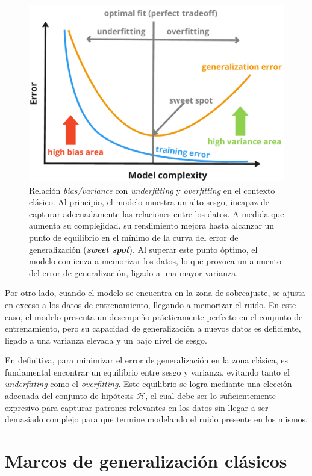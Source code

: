 \begin{figure}[h]
    \centering
    \includegraphics[width=0.6\linewidth]{img/biasvarianceunderoverfitting.png}
    \caption[Relación \textit{bias/variance} con \textit{underfitting} y \textit{overfitting} en el contexto clásico.] {Relación \textit{bias/variance} con \textit{underfitting} y \textit{overfitting} en el contexto clásico. Al principio, el modelo muestra un alto sesgo, incapaz de capturar adecuadamente las relaciones entre los datos. A medida que aumenta su complejidad, su rendimiento mejora hasta alcanzar un punto de equilibrio en el mínimo de la curva del error de generalización (\textbf{\textit{sweet spot}}). Al superar este punto óptimo, el modelo comienza a memorizar los datos, lo que provoca un aumento del error de generalización, ligado a una mayor varianza.}\label{fig:biasvarianceunderoverfitting}
\end{figure}

Por otro lado, cuando el modelo se encuentra en la zona de sobreajuste, se ajusta en exceso a los datos de entrenamiento, llegando a memorizar el ruido. En este caso, el modelo presenta un desempeño prácticamente perfecto en el conjunto de entrenamiento, pero su capacidad de generalización a nuevos datos es deficiente, ligado a una varianza elevada y un bajo nivel de sesgo.

En definitiva, para minimizar el error de generalización en la zona clásica, es fundamental encontrar un equilibrio entre sesgo y varianza, evitando tanto el \emph{underfitting} como el \emph{overfitting}. Este equilibrio se logra mediante una elección adecuada del conjunto de hipótesis $\mathcal{H}$, el cual debe ser lo suficientemente expresivo para capturar patrones relevantes en los datos sin llegar a ser demasiado complejo para que termine modelando el ruido presente en los mismos.

\section{Marcos de generalización clásicos}\label{sec:marcos-generalizacion-clasicos}

